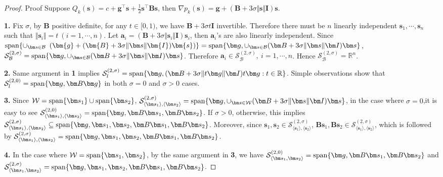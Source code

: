 \documentclass[colorlinks=true, linkcolor=blue, citecolor=blue, urlcolor=blue]{article}
\theoremstyle{plain}
\theoremstyle{definition}
\theoremstyle{remark}
\begin{document}
\begin{proof}{Proof}
Suppose $Q_k(\bm{s})=c+\bm{g}^\top \bm{s}+\frac{1}{2}\bm{s}^\top\bm{B}\bm{s}$, then $\nabla p_k(\bm{s})=\bm{g}+(\bm{B}+3\sigma \Vert \bm s\Vert\bm{I})\bm{s}$. 

\noindent\textbf{1.} Fix $\sigma$, by $\bm B$ positive definite, for any $t\in[0,1)$, we have $\bm B+3\sigma t\bm I$ invertible. Therefore there must be $n$ linearly independent $\bm s_1,\cdots,\bm s_n$ such that $\Vert \bm s_i\Vert=t\ (i=1,\cdots,n)$. Let $\bm a_i=(\bm B+3\sigma \Vert \bm s_i\Vert \bm I)\bm s_i$, then $\bm a_i$'s are also linearly independent. Since ${\rm span}\{\cup_{\bm s\in\mathcal{B}}\ \left(\bm{g}+(\bm{B}+3\sigma \Vert \bm s\Vert\bm{I})\bm{s}\right)\}={\rm span}\{\bm g,\cup_{\bm s\in\mathcal{B}}(\bm B+3\sigma \Vert \bm s\Vert \bm I)\bm s\}$, $\mathcal{S}_{\mathcal{B}}^{(2,\sigma)}={\rm span}\{\bm g,\cup_{\bm s\in\mathcal{B}}(\bm B+3\sigma \Vert \bm s\Vert \bm I)\bm s\}$. Therefore $\bm a_i\in\mathcal{S}_{\mathcal{B}}^{(2,\sigma)},\ i=1,\cdots,n$. Hence $\mathcal{S}_{\mathcal{B}}^{(2,\sigma)}=\mathbb{R}^n$.

\noindent\textbf{2.} 
Same argument in \textbf{1} implies $\mathcal{S}_{l}^{(2,\sigma)}={\rm span}\{\bm g, (\bm B+3\sigma \Vert t\bm g\Vert\bm I)t\bm g:t\in\mathbb{R}\}$. Simple observations show that $\mathcal{S}_{l}^{(2,0)}={\rm span}\{\bm g,\bm B\bm g \}$ in both $\sigma=0$ and $\sigma>0$ cases.

\noindent\textbf{3.} 
Since $\mathcal{W}={\rm span}\{\bm s_1\}\cup{\rm span}\{\bm s_2\}$, $\mathcal{S}_{\langle \bm s_1\rangle,\langle \bm s_2\rangle}^{(2,\sigma)}={\rm span}\{\bm g,\cup_{\bm s\in\mathcal{W}}(\bm B+3\sigma \Vert \bm s\Vert \bm I)\bm s\}$, in the case where $\sigma=0$,it is easy to see $\mathcal{S}_{\langle \bm s_1\rangle,\langle \bm s_2\rangle}^{(2,0)}={\rm span}\{\bm g,\bm B\bm s_1,\bm B\bm s_2\}$. If $\sigma>0$, otherwise, this implies $\mathcal{S}_{\langle \bm s_1\rangle,\langle \bm s_2\rangle}^{(2,\sigma)}\subseteq{\rm span}\{\bm g,\bm s_1,\bm s_2,\bm B\bm s_1,\bm B\bm s_2\}$. Moreover, since $\bm s_1, \bm s_2\in\mathcal{S}_{\langle \bm s_1\rangle,\langle \bm s_2\rangle}^{(2,\sigma)}$, $\bm B\bm s_1,\bm B\bm s_2\in\mathcal{S}_{\langle \bm s_1\rangle,\langle \bm s_2\rangle}^{(2,\sigma)}$, which is followed by $\mathcal{S}_{\langle \bm s_1\rangle,\langle \bm s_2\rangle}^{(2,\sigma)}={\rm span}\{\bm g,\bm s_1,\bm s_2,\bm B\bm s_1,\bm B\bm s_2\}$.

\noindent\textbf{4.} In the case where $\mathcal{W}={\rm span}\{\bm s_1,\bm s_2\}$, by the same argument in {\color{black}\textbf{3}}, we have $\mathcal{S}_{\langle \bm s_1,\bm s_2\rangle}^{(2,0)}={\rm span}\{\bm g,\bm B\bm s_1,\bm B\bm s_2\}$ and $\mathcal{S}_{\langle \bm s_1,\bm s_2\rangle}^{(2,\sigma)}={\rm span}\{\bm g,\bm s_1,\bm s_2,\bm B\bm s_1,\bm B\bm s_2\}$.
\end{proof}
\end{document}
